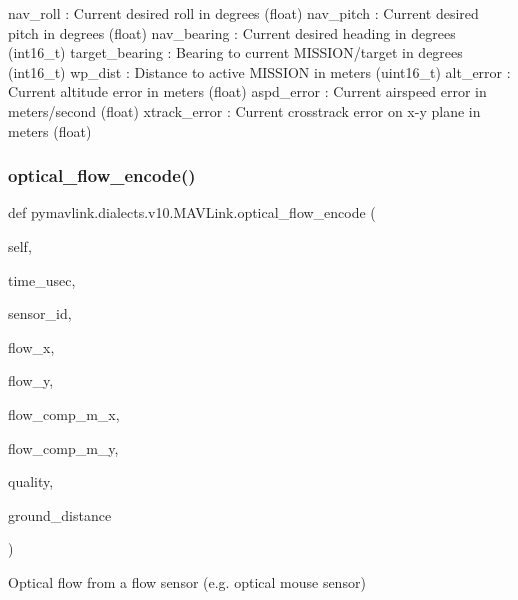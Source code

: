 \begin{DoxyVerb}
\begin{DoxyVerb}
\begin{DoxyVerb}
\begin{DoxyVerb}
\begin{DoxyVerb}
nav_roll                  : Current desired roll in degrees (float)
nav_pitch                 : Current desired pitch in degrees (float)
nav_bearing               : Current desired heading in degrees (int16_t)
target_bearing            : Bearing to current MISSION/target in degrees (int16_t)
wp_dist                   : Distance to active MISSION in meters (uint16_t)
alt_error                 : Current altitude error in meters (float)
aspd_error                : Current airspeed error in meters/second (float)
xtrack_error              : Current crosstrack error on x-y plane in meters (float)\end{DoxyVerb}
 \mbox{\label{classpymavlink_1_1dialects_1_1v10_1_1MAVLink_a26f4306f2014708c90a4a39a3ae4ba66}} 
\subsubsection{\texorpdfstring{optical\+\_\+flow\+\_\+encode()}{optical\_flow\_encode()}}
{\footnotesize\ttfamily def pymavlink.\+dialects.\+v10.\+M\+A\+V\+Link.\+optical\+\_\+flow\+\_\+encode (\begin{DoxyParamCaption}\item[{}]{self,  }\item[{}]{time\+\_\+usec,  }\item[{}]{sensor\+\_\+id,  }\item[{}]{flow\+\_\+x,  }\item[{}]{flow\+\_\+y,  }\item[{}]{flow\+\_\+comp\+\_\+m\+\_\+x,  }\item[{}]{flow\+\_\+comp\+\_\+m\+\_\+y,  }\item[{}]{quality,  }\item[{}]{ground\+\_\+distance }\end{DoxyParamCaption})}

\begin{DoxyVerb}Optical flow from a flow sensor (e.g. optical mouse sensor)


\end{DoxyVerb}
\end{DoxyVerb}
\end{DoxyVerb}
\end{DoxyVerb}
\end{DoxyVerb}
